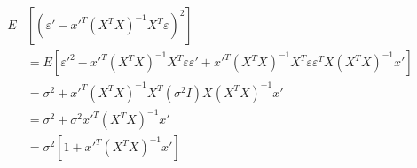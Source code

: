 \documentclass[10pt]{article}
\begin{document}
\begin{align*}\begin{split}
E &\left[\left(\varepsilon' - x'^T \left(X^T X\right)^{-1} X^T \varepsilon\right)^2\right] \\
&= E\left[\varepsilon'^2 
- x'^T \left(X^T X\right)^{-1} X^T \varepsilon \varepsilon'
+ x'^T \left(X^T X \right)^{-1} X^T \varepsilon \varepsilon^T X \left(X^T X \right)^{-1} x'
\right] \\
&= \sigma^2 + x'^T \left(X^T X\right)^{-1} X^T \left(\sigma^2 I\right) X \left(X^T X\right)^{-1} x' \\
&= \sigma^2 + \sigma^2 x'^T \left(X^T X\right)^{-1} x' \\
&= \sigma^2 \left[ 1 + x'^T \left(X^T X\right)^{-1} x' \right] \\
\end{split}\end{align*}
\end{document}

